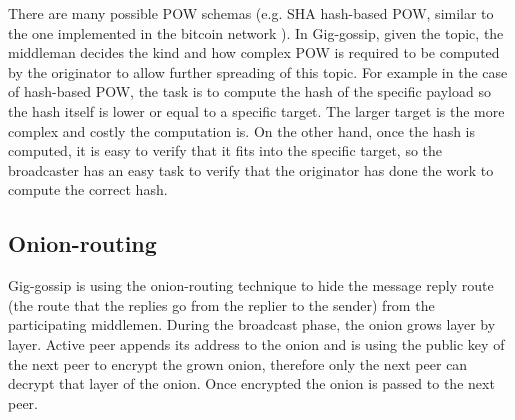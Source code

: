 \documentclass{article}
\begin{document}
There are many possible POW schemas (e.g. SHA hash-based POW, similar to the one implemented in the bitcoin network \cite{nakamoto2009bitcoin}). In Gig-gossip, given the topic, the middleman decides the kind and how complex POW is required to be computed by the originator to allow further spreading of this topic. For example in the case of hash-based POW, the task is to compute the hash of the specific payload so the hash itself is lower or equal to a specific target. The larger target is the more complex and costly the computation is. On the other hand, once the hash is computed, it is easy to verify that it fits into the specific target, so the broadcaster has an easy task to verify that the originator has done the work to compute the correct hash.

\subsection{Onion-routing}
Gig-gossip is using the onion-routing technique to hide the message reply route (the route that the replies go from the replier to the sender) from the participating middlemen. During the broadcast phase, the onion grows layer by layer. Active peer appends its address to the onion and is using the public key of the next peer to encrypt the grown onion, therefore only the next peer can decrypt that layer of the onion. Once encrypted the onion is passed to the next peer.
\end{document}
